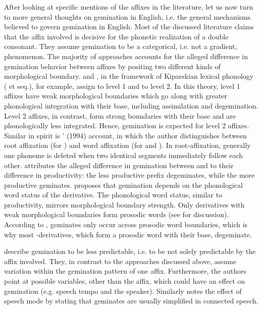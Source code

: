 After looking at specific mentions of the affixes in the literature, let us now turn to more general thoughts on gemination in English, i.e. the general mechanisms believed to govern gemination in English. 
Most of the discussed literature claims that the affix involved is decisive for the phonetic realization of a double consonant. They assume gemination to be a categorical, i.e. not a gradient, phenomenon. The majority of approaches accounts for the alleged difference in gemination behavior between affixes by positing two different kinds of morphological boundary. \citet[18]{Mohanan.1986} and \citet[119 ff]{Borowsky.1986}, in the framework of Kiparskian lexical phonology (\citealt{Kiparsky.1982} et seq.), for example, assign  to level 1 and  to level 2. In this theory, level 1 affixes have weak morphological boundaries which go along with greater phonological integration with their base, including assimilation and degemination. Level 2 affixes, in contrast, form strong boundaries with their base and are phonologically less integrated. Hence, gemination is expected for level 2 affixes. Similar in spirit is \citeauthor{Harris.1994}' (1994) account, in which the author distinguishes between root affixation (for ) and word affixation (for  and ). In root-affixation, generally one phoneme is deleted when two identical segments immediately follow each other. 
\cite{CohenGoldberg.2013} attributes the alleged difference in gemination between  and  to their difference in  productivity: the less productive prefix  degeminates, while the more productive  geminates. 
\citet[354]{Giegerich.2012} proposes that gemination depends on the phonological word status of the derivative. The phonological word status, similar to productivity, mirrors morphological boundary strength. Only derivatives with weak morphological boundaries form prosodic words (see  for discussion). According to \cite{Giegerich.2012}, geminates only occur across prosodic word boundaries, which is why most -derivatives, which form a prosodic word with their base, degeminate.

\citet[169]{Bauer.2013} describe gemination to be less predictable, i.e.  to be not solely  predictable by the affix involved. They, in contrast to the approaches discussed above, assume variation within the gemination pattern of one affix. Furthermore, the authors point at possible variables, other than the affix, which could have an effect on gemination (e.g. speech tempo and the speaker). Similarly \citet[191, 288]{Giegerich.1992} notes the effect of speech mode by stating that geminates are usually simplified in connected speech.
 
